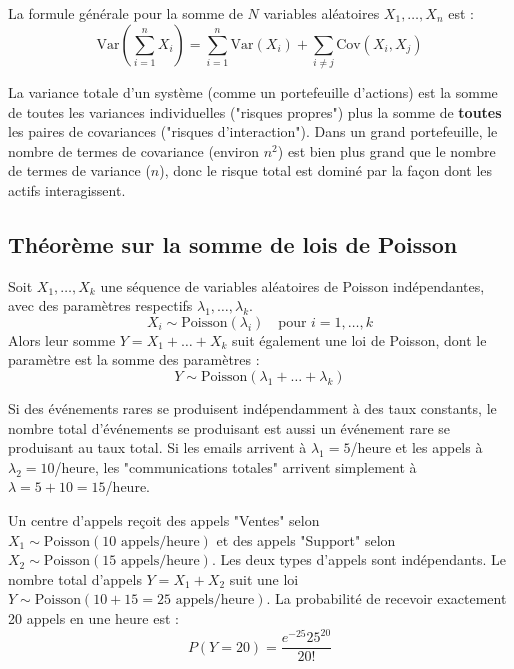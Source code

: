 \begin{theorembox}
La formule générale pour la somme de $N$ variables aléatoires $X_1, \dots, X_n$ est :
$$\text{Var}\left(\sum_{i=1}^n X_i\right) = \sum_{i=1}^n \text{Var}(X_i) + \sum_{i \neq j} \text{Cov}(X_i, X_j)$$
\end{theorembox}

\begin{intuitionbox}
La variance totale d'un système (comme un portefeuille d'actions) est la somme de toutes les variances individuelles ("risques propres") plus la somme de \textbf{toutes} les paires de covariances ("risques d'interaction"). Dans un grand portefeuille, le nombre de termes de covariance (environ $n^2$) est bien plus grand que le nombre de termes de variance ($n$), donc le risque total est dominé par la façon dont les actifs interagissent.
\end{intuitionbox}

\subsection{Théorème sur la somme de lois de Poisson}

\begin{theorembox}
Soit $X_1, \dots, X_k$ une séquence de variables aléatoires de Poisson indépendantes, avec des paramètres respectifs $\lambda_1, \dots, \lambda_k$.
$$X_i \sim \text{Poisson}(\lambda_i) \quad \text{pour } i=1, \dots, k$$
Alors leur somme $Y = X_1 + \dots + X_k$ suit également une loi de Poisson, dont le paramètre est la somme des paramètres :
$$Y \sim \text{Poisson}(\lambda_1 + \dots + \lambda_k)$$
\end{theorembox}

\begin{intuitionbox}
Si des événements rares se produisent indépendamment à des taux constants, le nombre total d'événements se produisant est aussi un événement rare se produisant au taux total. Si les emails arrivent à $\lambda_1=5$/heure et les appels à $\lambda_2=10$/heure, les "communications totales" arrivent simplement à $\lambda = 5+10 = 15$/heure.
\end{intuitionbox}

\begin{examplebox}
Un centre d'appels reçoit des appels "Ventes" selon $X_1 \sim \text{Poisson}(10 \text{ appels/heure})$ et des appels "Support" selon $X_2 \sim \text{Poisson}(15 \text{ appels/heure})$. Les deux types d'appels sont indépendants.
Le nombre total d'appels $Y = X_1 + X_2$ suit une loi $Y \sim \text{Poisson}(10+15=25 \text{ appels/heure})$.
La probabilité de recevoir exactement 20 appels en une heure est :
$$P(Y=20) = \frac{e^{-25} 25^{20}}{20!}$$
\end{examplebox}

